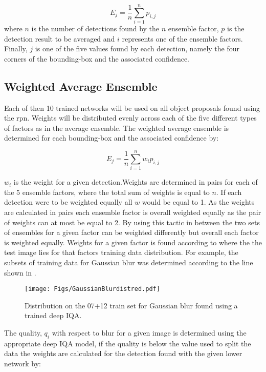 \documentclass[a4paper,twoside]{article}
\begin{document}
\begin{equation}
  E_{j} = \frac{1}{n} \sum_{i=1}^{n} p_{i,j} 
\end{equation}
where $n$ is the number of detections found by the $n$ ensemble factor, $p$ is the detection result to be averaged and $i$ represents one of the ensemble factors. Finally, $j$ is one of the five values found by each detection, namely the four corners of the bounding-box and the associated confidence.


\subsection{Weighted Average Ensemble}
Each of then 10 trained networks will be used on all object proposals found using the \gls{rpn}. Weights will be distributed evenly across each of the five different types of factors as in the average ensemble. The weighted average ensemble is determined for each bounding-box and the associated confidence by:

\begin{equation}
	E_{j} = \frac{1}{n} \sum_{i=1}^{n} w_ip_{i,j} 
\end{equation}

$w_i$ is the weight for a given detection.Weights are determined in pairs for each of the 5 ensemble factors, where the total sum of weights is equal to $n$. If each detection were to be weighted equally all $w$ would be equal to 1. As the weights are calculated in pairs each ensemble factor is overall weighted equally as the pair of weights can at most be equal to 2. By using this tactic in between the two sets of ensembles for a given factor can be weighted differently but overall each factor is weighted equally.
Weights for a given factor is found according to where the the test image lies for that factors training data distribution. For example, the subsets of training data for Gaussian blur was determined according to the line shown in . 

\begin{figure}[H]
  \centering
    \texttt{[image: Figs/GaussianBlurdistred.pdf]}
      \caption{Distribution on the 07+12 train set for Gaussian blur found using a trained deep IQA.}
    \label{fig:blur_dist}
\end{figure}

The quality, $q_i$ with respect to blur for a given image is determined using the appropriate deep IQA model, if the quality is below the value used to split the data the weights are calculated for the detection found with the given lower network by:
\end{document}
